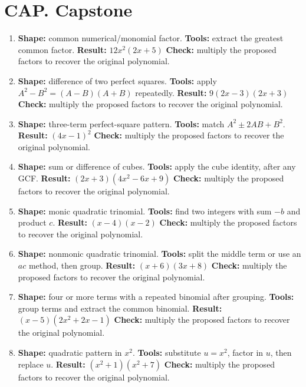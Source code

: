 \documentclass[11pt,oneside]{book}
\begin{document}
\section*{CAP. Capstone}
\begin{enumerate}[leftmargin=*,label=\textbf{CAP\arabic*.},itemsep=0.45\baselineskip]
\item \textbf{Shape:} common numerical/monomial factor. \textbf{Tools:} extract the greatest common factor. \textbf{Result:} $ 12 x^{2} \left(2 x + 5\right) $ \textbf{Check:} multiply the proposed factors to recover the original polynomial.
\item \textbf{Shape:} difference of two perfect squares. \textbf{Tools:} apply $A^2-B^2=(A-B)(A+B)$ repeatedly. \textbf{Result:} $ 9 \left(2 x - 3\right) \left(2 x + 3\right) $ \textbf{Check:} multiply the proposed factors to recover the original polynomial.
\item \textbf{Shape:} three-term perfect-square pattern. \textbf{Tools:} match $A^2\pm2AB+B^2$. \textbf{Result:} $ \left(4 x - 1\right)^{2} $ \textbf{Check:} multiply the proposed factors to recover the original polynomial.
\item \textbf{Shape:} sum or difference of cubes. \textbf{Tools:} apply the cube identity, after any GCF. \textbf{Result:} $ \left(2 x + 3\right) \left(4 x^{2} - 6 x + 9\right) $ \textbf{Check:} multiply the proposed factors to recover the original polynomial.
\item \textbf{Shape:} monic quadratic trinomial. \textbf{Tools:} find two integers with sum $-b$ and product $c$. \textbf{Result:} $ \left(x - 4\right) \left(x - 2\right) $ \textbf{Check:} multiply the proposed factors to recover the original polynomial.
\item \textbf{Shape:} nonmonic quadratic trinomial. \textbf{Tools:} split the middle term or use an $ac$ method, then group. \textbf{Result:} $ \left(x + 6\right) \left(3 x + 8\right) $ \textbf{Check:} multiply the proposed factors to recover the original polynomial.
\item \textbf{Shape:} four or more terms with a repeated binomial after grouping. \textbf{Tools:} group terms and extract the common binomial. \textbf{Result:} $ \left(x - 5\right) \left(2 x^{2} + 2 x - 1\right) $ \textbf{Check:} multiply the proposed factors to recover the original polynomial.
\item \textbf{Shape:} quadratic pattern in $x^2$. \textbf{Tools:} substitute $u=x^2$, factor in $u$, then replace $u$. \textbf{Result:} $ \left(x^{2} + 1\right) \left(x^{2} + 7\right) $ \textbf{Check:} multiply the proposed factors to recover the original polynomial.

\end{enumerate}
\end{document}
